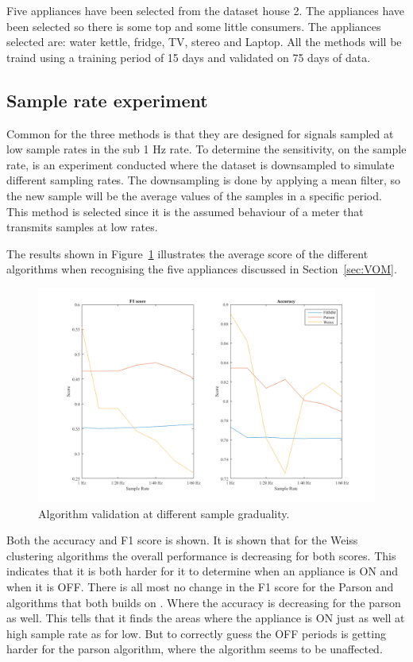 Five appliances have been selected from the  dataset house 2. The appliances have been selected so there is some top and some little consumers. The appliances selected are: water kettle, fridge, TV, stereo and Laptop. All the methods will be traind using a training period of 15 days and validated on 75 days of data. 

\subsection{Sample rate experiment}
Common for the three methods is that they are designed for signals sampled at low sample rates in the sub 1 Hz rate. To determine the sensitivity, on the sample rate, is an experiment conducted where the dataset is downsampled to simulate different sampling rates. The downsampling is done by applying a mean filter, so the new sample will be the average values of the samples in a specific period. This method is selected since it is the assumed behaviour of a meter that transmits samples at low rates. 

The results shown in Figure~\ref{fig:DSE} illustrates the average score of the different algorithms when recognising the five appliances discussed in Section~\ref{sec:VOM}. 

\begin{figure}[H]
\centering
\includegraphics[width=1\textwidth]{billeder/AlgoScoreNilm.png}
\caption{Algorithm validation at different sample graduality.}
\label{fig:DSE}
\end{figure}

Both the accuracy and F1 score is shown. It is shown that for the Weiss clustering algorithms the overall performance is decreasing for both scores. This indicates that it is both harder for it to determine when an appliance is ON and when it is OFF. There is all most no change in the F1 score for the Parson and  algorithms that both builds on . Where the accuracy is decreasing for the parson as well. This tells that it finds the areas where the appliance is ON just as well at high sample rate as for low. But to correctly guess the OFF periods is getting harder for the parson algorithm, where the  algorithm seems to be unaffected. 

